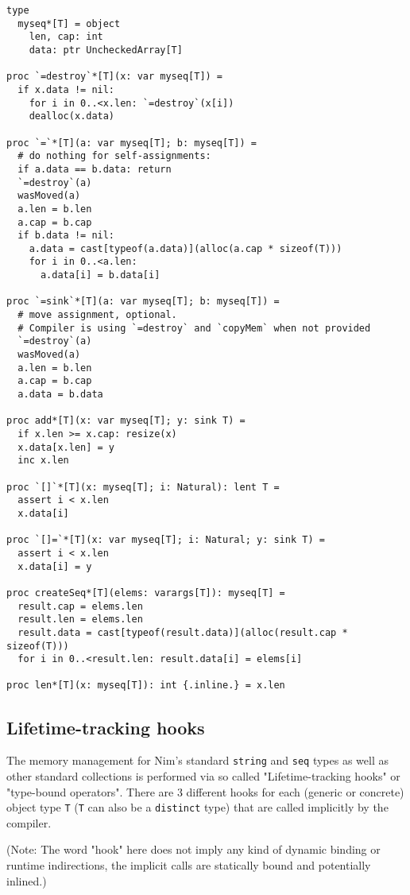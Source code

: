 \begin{verbatim}
type
  myseq*[T] = object
    len, cap: int
    data: ptr UncheckedArray[T]

proc `=destroy`*[T](x: var myseq[T]) =
  if x.data != nil:
    for i in 0..<x.len: `=destroy`(x[i])
    dealloc(x.data)

proc `=`*[T](a: var myseq[T]; b: myseq[T]) =
  # do nothing for self-assignments:
  if a.data == b.data: return
  `=destroy`(a)
  wasMoved(a)
  a.len = b.len
  a.cap = b.cap
  if b.data != nil:
    a.data = cast[typeof(a.data)](alloc(a.cap * sizeof(T)))
    for i in 0..<a.len:
      a.data[i] = b.data[i]

proc `=sink`*[T](a: var myseq[T]; b: myseq[T]) =
  # move assignment, optional.
  # Compiler is using `=destroy` and `copyMem` when not provided
  `=destroy`(a)
  wasMoved(a)
  a.len = b.len
  a.cap = b.cap
  a.data = b.data

proc add*[T](x: var myseq[T]; y: sink T) =
  if x.len >= x.cap: resize(x)
  x.data[x.len] = y
  inc x.len

proc `[]`*[T](x: myseq[T]; i: Natural): lent T =
  assert i < x.len
  x.data[i]

proc `[]=`*[T](x: var myseq[T]; i: Natural; y: sink T) =
  assert i < x.len
  x.data[i] = y

proc createSeq*[T](elems: varargs[T]): myseq[T] =
  result.cap = elems.len
  result.len = elems.len
  result.data = cast[typeof(result.data)](alloc(result.cap * sizeof(T)))
  for i in 0..<result.len: result.data[i] = elems[i]

proc len*[T](x: myseq[T]): int {.inline.} = x.len
\end{verbatim}

\hypertarget{lifetime-tracking-hooks}{%
\subsection{Lifetime-tracking hooks}\label{lifetime-tracking-hooks}}

The memory management for Nim's standard \texttt{string} and
\texttt{seq} types as well as other standard collections is performed
via so called "Lifetime-tracking hooks" or "type-bound operators". There
are 3 different hooks for each (generic or concrete) object type
\texttt{T} (\texttt{T} can also be a \texttt{distinct} type) that are
called implicitly by the compiler.

(Note: The word "hook" here does not imply any kind of dynamic binding
or runtime indirections, the implicit calls are statically bound and
potentially inlined.)

